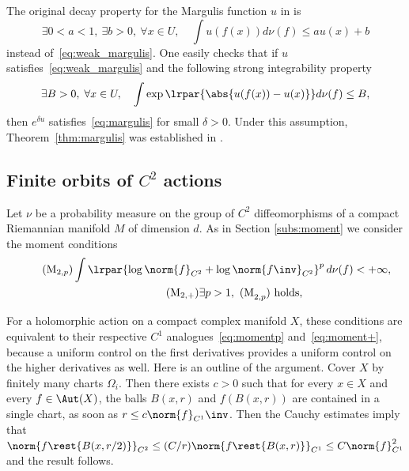 The original decay property for the Margulis function $u$ in
\cite{eskin-margulis, benoist-quint3}
is
\begin{equation}
\label{eq:margulis}
\exists 0<a<1, \ \exists b>0, \ \forall x\in U, \quad \int u(f(x))d\nu(f) \leq au(x) +b
\end{equation}
instead of~\eqref{eq:weak_margulis}. One easily checks that if $u$ satisfies~\eqref{eq:weak_margulis} and the following strong integrability property
\begin{equation}
\label{eq:margulis_moment_exp}
\exists B>0,\; \forall x\in U, \quad \int \exp\lrpar{\abs{u(f(x)) - u(x) } }d\nu(f) \leq B,
\end{equation}
then $e^{\delta u}$
satisfies~\eqref{eq:margulis} for small $\delta>0$. Under this assumption, Theorem~\ref{thm:margulis} was established in
\cite{benoist-quint3}.

\subsection{Finite orbits of $C^2$ actions}\label{par:finite-orbits-C2-actions}
Let $\nu$ be a probability measure on the group of $C^2$ diffeomorphisms of a compact Riemannian
manifold $M$ of dimension $d$.
As in Section \ref{subs:moment} we consider the moment conditions
\begin{align}
\label{eq:moment2p}
\tag{M$_{2, p}$}
\int \lrpar{ \log\norm{f}_{C^2 }+ \log\norm{f\inv}_{C^2 }} ^p \, d\nu (f) < + \infty, \\
\label{eq:moment2+}
\tag{M$_{2, +}$}
\exists p>1, \ \mathrm{(M}_{2,p}\mathrm{)} \text{ holds}, \quad \quad \quad\quad \quad \quad \quad\quad
\end{align}
\begin{rem}\label{rem:moment-condition-holo}
For a holomorphic action on a compact
complex manifold $X$, these conditions are equivalent to their respective
$C^1$ analogues~\eqref{eq:momentp} and~\eqref{eq:moment+}, because a uniform control on the first derivatives provides a uniform control on the higher derivatives as well.
Here is an outline of the argument.
Cover $X$ by finitely many charts $\Omega_i$.
Then there exists $c>0$ such that for every $x\in X$ and every $f\in \Aut(X)$, the balls
$B(x,r)$ and $f(B(x,r))$
are contained in a single chart, as soon as $r \leq c \norm{f}_{C^1}\inv$. Then the
Cauchy estimates imply that $\norm{f\rest{B(x, r/2)}}_{C^2}\leq (C/r) \norm{f\rest{B(x, r)}}_{C^1} \leq C \norm{f}_{C^1}^2$ and the result follows.
\end{rem}

